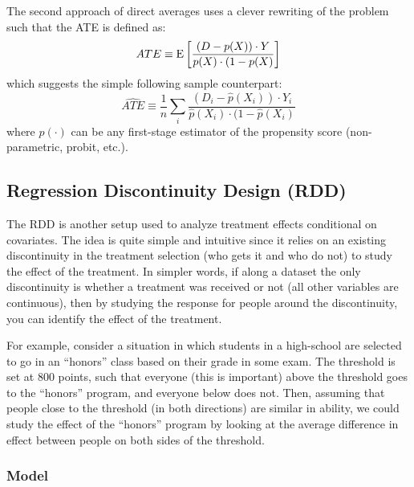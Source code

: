 The second approach of direct averages uses a clever rewriting of the problem such that the ATE is defined as: $$ATE \equiv \operatorname{E}\left[\frac{(D - p(X))\cdot Y}{p(X)\cdot (1 - p(X)}\right] $$ which suggests the simple following sample counterpart: $$\widehat{ATE} \equiv \frac{1}{n}\sum_{i} \frac{(D_i - \hat p(X_i))\cdot Y_i}{\hat p(X_i)\cdot (1 - \hat p(X_i)} $$ where $\hat p(\cdot)$ can be any first-stage estimator of the propensity score (non-parametric, probit, etc.).

\subsection{Regression Discontinuity Design (RDD)}

The RDD is another setup used to analyze treatment effects conditional on covariates. The idea is quite simple and intuitive since it relies on an existing discontinuity in the treatment selection (who gets it and who do not) to study the effect of the treatment. In simpler words, if along a dataset the only discontinuity is whether a treatment was received or not (all other variables are continuous), then by studying the response for people around the discontinuity, you can identify the effect of the treatment. 

For example, consider a situation in which students in a high-school are selected to go in an ``honors'' class based on their grade in some exam. The threshold is set at 800 points, such that everyone (this is important) above the threshold goes to the ``honors'' program, and everyone below does not. Then, assuming that people close to the threshold (in both directions) are similar in ability, we could study the effect of the ``honors'' program by looking at the average difference in effect between people on both sides of the threshold.

\subsubsection{Model}

